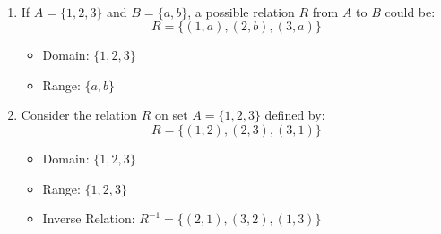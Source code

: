 \begin{example}
	\ \begin{enumerate}
		\item If \( A = \{1, 2, 3\} \) and \( B = \{a, b\} \), a possible relation \( R \) from \( A \) to \( B \) could be:
		\[
		R = \{ (1, a), (2, b), (3, a) \}
		\]
		\begin{itemize}
			\item Domain: \(\{1, 2, 3\}\)
			\item Range: \(\{a, b\}\)
		\end{itemize}
		
		\item Consider the relation \( R \) on set \( A = \{1, 2, 3\} \) defined by:
		\[
		R = \{ (1, 2), (2, 3), (3, 1) \}
		\]
		\begin{itemize}
			\item Domain: \(\{1, 2, 3\}\)
			\item Range: \(\{1, 2, 3\}\)
			\item Inverse Relation: \( R^{-1} = \{ (2, 1), (3, 2), (1, 3) \} \)
		\end{itemize}
	\end{enumerate}
\end{example}